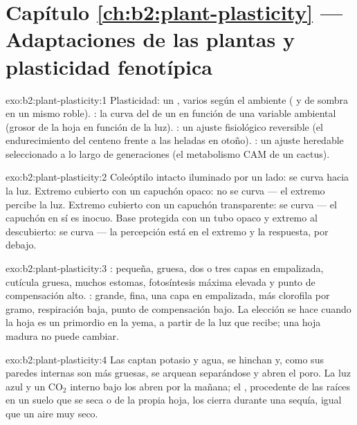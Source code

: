 \section*{Capítulo \ref{ch:b2:plant-plasticity} --- Adaptaciones de las plantas y plasticidad fenotípica}

\begin{solution}{exo:b2:plant-plasticity:1}
Plasticidad: un , varios  según el ambiente (
y de sombra en un mismo roble). : la curva del 
de un  en función de una variable ambiental (grosor de la hoja en
función de la luz). : un ajuste fisiológico reversible (el
endurecimiento del centeno frente a las heladas en otoño). : un
ajuste heredable seleccionado a lo largo de generaciones (el metabolismo
CAM de un cactus).
\end{solution}

\begin{solution}{exo:b2:plant-plasticity:2}
Coleóptilo intacto iluminado por un lado: se curva hacia la luz. Extremo
cubierto con un capuchón opaco: no se curva --- el extremo percibe la luz.
Extremo cubierto con un capuchón transparente: se curva --- el capuchón en
sí es inocuo. Base protegida con un tubo opaco y extremo al descubierto:
se curva --- la percepción está en el extremo y la respuesta, por debajo.
\end{solution}

\begin{solution}{exo:b2:plant-plasticity:3}
: pequeña, gruesa, dos o tres capas en empalizada, cutícula
gruesa, muchos estomas, fotosíntesis máxima elevada y punto de
compensación alto. : grande, fina, una capa en empalizada,
más clorofila por gramo, respiración baja, punto de compensación bajo. La
elección se hace cuando la hoja es un primordio en la yema, a partir de la
luz que recibe; una hoja madura no puede cambiar.
\end{solution}

\begin{solution}{exo:b2:plant-plasticity:4}
Las  captan potasio y agua, se hinchan y, como sus
paredes internas son más gruesas, se arquean separándose y abren el poro.
La luz azul y un $\mathrm{CO_2}$ interno bajo los abren por la mañana; el
, procedente de las raíces en un suelo que se seca o de la
propia hoja, los cierra durante una sequía, igual que un aire muy seco.
\end{solution}

